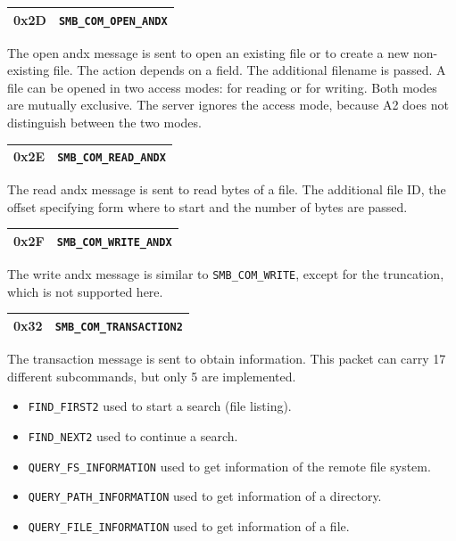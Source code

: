 \documentclass[11pt,a4paper]{book}
\begin{document}
\begin{center}
\renewcommand{\tabcolsep}{5mm}
\begin{tabular}{p{3cm}p{8cm}}
0x2D & \texttt{SMB\_COM\_OPEN\_ANDX} \\
\hline
\end{tabular}
\end{center}
The open andx message is sent to open an existing file or to create a new non-existing file. The action depends on a field. The additional filename is passed. A file can be opened in two access modes: for reading or for writing. Both modes are mutually exclusive. The server ignores the access mode, because A2 does not distinguish between the two modes.

\begin{center}
\renewcommand{\tabcolsep}{5mm}
\begin{tabular}{p{3cm}p{8cm}}
0x2E & \texttt{SMB\_COM\_READ\_ANDX} \\
\hline
\end{tabular}
\end{center}
The read andx message is sent to read bytes of a file. The additional file ID, the offset specifying form where to start and the number of bytes are passed. 

\begin{center}
\renewcommand{\tabcolsep}{5mm}
\begin{tabular}{p{3cm}p{8cm}}
0x2F & \texttt{SMB\_COM\_WRITE\_ANDX} \\
\hline
\end{tabular}
\end{center}
The write andx message is similar to \texttt{SMB\_COM\_WRITE}, except for the truncation, which is not supported here.

\begin{flushleft}
\begin{center}
\renewcommand{\tabcolsep}{5mm}
\begin{tabular}{p{3cm}p{8cm}}
0x32 & \texttt{SMB\_COM\_TRANSACTION2} \\
\hline
\end{tabular}
\end{center}
The transaction message is sent to obtain information. This packet can carry 17 different subcommands, but only 5 are implemented.
\begin{itemize}
\item \texttt{FIND\_FIRST2} used to start a search (file listing).
\item \texttt{FIND\_NEXT2} used to continue a search.
\item \texttt{QUERY\_FS\_INFORMATION} used to get information of the remote file system.
\item \texttt{QUERY\_PATH\_INFORMATION} used to get information of a directory.
\item \texttt{QUERY\_FILE\_INFORMATION} used to get information of a file.
\end{itemize}
\end{flushleft}
\end{document}

